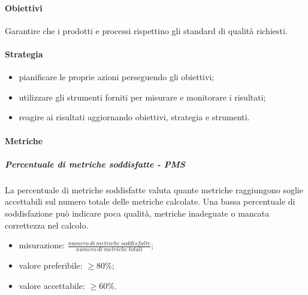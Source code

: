 		\paragraph{Obiettivi}
		Garantire che i prodotti e processi rispettino gli standard di qualità richiesti.
		\paragraph{Strategia}
		\begin{itemize}
			\item pianificare le proprie azioni perseguendo gli obiettivi;
			\item utilizzare gli strumenti forniti per misurare e monitorare i risultati;
			\item reagire ai risultati aggiornando obiettivi, strategia e strumenti.
		\end{itemize}
		\paragraph{Metriche}
			\subparagraph{Percentuale di metriche soddisfatte - PMS}
			La percentuale di metriche soddisfatte valuta quante metriche raggiungono soglie accettabili sul numero totale delle metriche calcolate. Una bassa percentuale di soddisfazione può indicare poca qualità, metriche inadeguate o mancata correttezza nel calcolo.
			\begin{itemize}
				\item misurazione: $\frac{numero\ di\ metriche\ soddisfatte}{numero\ di\ metriche\ totali} $;
				\item valore preferibile: $ \geq 80\%$;
				\item valore accettabile: $ \geq 60\%$.
			\end{itemize}
		